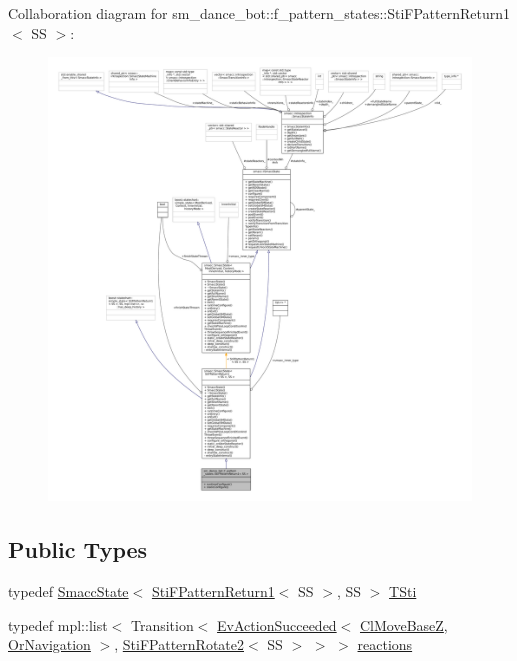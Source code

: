 Collaboration diagram for sm\+\_\+dance\+\_\+bot\+:\+:f\+\_\+pattern\+\_\+states\+:\+:Sti\+F\+Pattern\+Return1$<$ SS $>$\+:
\nopagebreak
\begin{figure}[H]
\begin{center}
\leavevmode
\includegraphics[width=350pt]{classsm__dance__bot_1_1f__pattern__states_1_1StiFPatternReturn1__coll__graph}
\end{center}
\end{figure}
\subsection*{Public Types}
\begin{DoxyCompactItemize}
\item 
typedef \hyperlink{classSmaccState}{Smacc\+State}$<$ \hyperlink{classsm__dance__bot_1_1f__pattern__states_1_1StiFPatternReturn1}{Sti\+F\+Pattern\+Return1}$<$ SS $>$, SS $>$ \hyperlink{classsm__dance__bot_1_1f__pattern__states_1_1StiFPatternReturn1_afd0d5d7e8dc6ad87f7314176d86d919e}{T\+Sti}
\item 
typedef mpl\+::list$<$ Transition$<$ \hyperlink{structsmacc_1_1default__events_1_1EvActionSucceeded}{Ev\+Action\+Succeeded}$<$ \hyperlink{classcl__move__base__z_1_1ClMoveBaseZ}{Cl\+Move\+BaseZ}, \hyperlink{classsm__dance__bot_1_1OrNavigation}{Or\+Navigation} $>$, \hyperlink{classsm__dance__bot_1_1f__pattern__states_1_1StiFPatternRotate2}{Sti\+F\+Pattern\+Rotate2}$<$ SS $>$ $>$ $>$ \hyperlink{classsm__dance__bot_1_1f__pattern__states_1_1StiFPatternReturn1_a2fcaf186ce44b90735584e304831f944}{reactions}
\end{DoxyCompactItemize}
